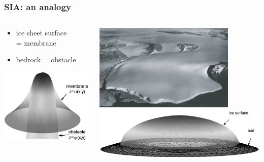 \documentclass[hide notes,intlimits]{beamer}
\begin{document}
\begin{frame}
  \frametitle{SIA: an analogy}

\begin{columns}
\begin{column}{0.35\textwidth}
\begin{itemize}
\item ice sheet surface \\ = \alert{membrane}
\item bedrock = \alert{obstacle}
\end{itemize}
\vfill
\begin{center}
\includegraphics[width=1.1\textwidth]{classicalobs}
\end{center}
\end{column}
\begin{column}{0.65\textwidth}
\begin{center}
\includegraphics[width=0.8\textwidth]{polaris} \\
\includegraphics[width=\textwidth]{capnonflatobs}
\end{center}
\end{column}
\end{columns}
\end{frame}
\end{document}
